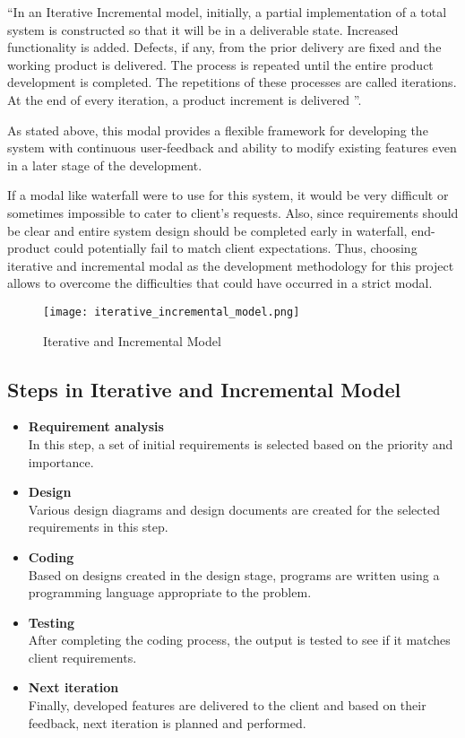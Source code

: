 \documentclass[12pt]{report}
\begin{document}
``In an Iterative Incremental model, initially, a partial implementation of a total system is constructed so that it will be in a deliverable state. Increased functionality is added. Defects, if any, from the prior delivery are fixed and the working product is delivered. The process is repeated until the entire product development is completed. The repetitions of these processes are called iterations. At the end of every iteration, a product increment is delivered \cite{tpoint_2019_sdlc}''.

As stated above, this modal provides a flexible framework for developing the system with continuous user-feedback and ability to modify existing features even in a later stage of the development.

If a modal like waterfall were to use for this system, it would be very difficult or sometimes impossible to cater to client's requests. Also, since requirements should be clear and entire system design should be completed early in waterfall, end-product could potentially fail to match client expectations. Thus, choosing iterative and incremental modal as the development methodology for this project allows to overcome the difficulties that could have occurred in a strict modal.

\begin{figure}[H]
	\centering
	\texttt{[image: iterative\_incremental\_model.png]}
	\caption{Iterative and Incremental Model}
\end{figure}

\subsection{Steps in Iterative and Incremental Model}
\begin{itemize}
	\item {\bf{Requirement analysis}}\\
	      In this step, a set of initial requirements is selected based on the priority and importance.

	\item {\bf{Design}}\\
	      Various design diagrams and design documents are created for the selected requirements in this step.

	\item {\bf{Coding}}\\
	      Based on designs created in the design stage, programs are written using a programming language appropriate to the problem.

	\item {\bf{Testing}}\\
	      After completing the coding process, the output is tested to see if it matches client requirements.

	\item {\bf{Next iteration}}\\
	      Finally, developed features are delivered to the client and based on their feedback, next iteration is planned and performed.

\end{itemize}
\end{document}
